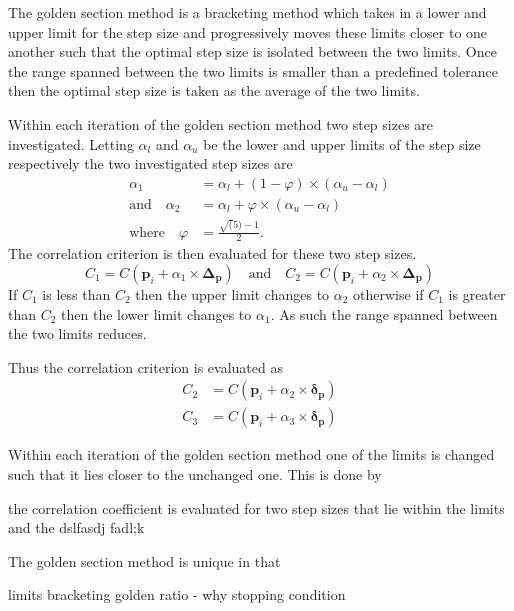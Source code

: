 \documentclass[12pt,oneside,openany,a4paper, %
english, %
masters-t, goldenblock]{usthesis}
\begin{document}
The golden section method is a bracketing method which takes in a lower and upper limit for the step size and progressively moves these limits closer to one another such that the optimal step size is isolated between the two limits. Once the range spanned between the two limits is smaller than a predefined tolerance then the optimal step size is taken as the average of the two limits.

Within each iteration of the golden section method two step sizes are investigated. Letting $\alpha_l$ and $\alpha_u$ be the lower and upper limits of the step size respectively the two investigated step sizes are
\begin{align}
  \label{eq: GS 1}
  \alpha_1 &=\alpha_l+(1-\varphi) \times (\alpha_u-\alpha_l) \\
  \label{eq: GS 2}
  \text{and} \quad \alpha_2 &= \alpha_l+\varphi \times (\alpha_u-\alpha_l) \\
  \text{where} \quad \varphi &= \frac{\sqrt(5)-1}{2}.
\end{align}
The correlation criterion is then evaluated for these two step sizes.
\begin{equation}
 C_1=C(\bm{p}_i + \alpha_1 \times \bm{\Delta_p}) \quad \text{and} \quad C_2=C(\bm{p}_i + \alpha_2 \times \bm{\Delta_p}) 
\end{equation}
If $C_1$ is less than $C_2$ then the upper limit changes to $\alpha_2$ otherwise if $C_1$ is greater than $C_2$ then the lower limit changes to $\alpha_1$. As such the range spanned between the two limits reduces.



Thus the correlation criterion is evaluated as 
\begin{align}
    C_2 &=C(\bm{p}_i + \alpha_2 \times \bm{\delta_p}) \\
    C_3 &=C(\bm{p}_i + \alpha_3 \times \bm{\delta_p})
\end{align}



Within each iteration of the golden section method one of the limits is changed such that it lies closer to the unchanged one. This is done by 



 the correlation coefficient is evaluated for two step sizes that lie within the limits and the dslfasdj fadl;k

The golden section method is unique in that 




limits 
bracketing
golden ratio - why 
stopping condition
\end{document}
